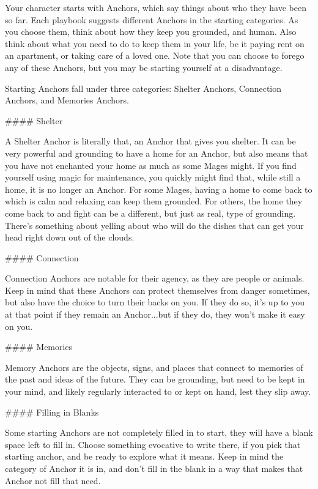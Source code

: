 \documentclass[
  oneside,
  statementpaper,
  9pt]{memoir}
\begin{document}
\begin{Player}

Your character starts with Anchors, which say things about who they have been so far. Each playbook suggests different Anchors in the starting categories. As you choose them, think about how they keep you grounded, and human. Also think about what you need to do to keep them in your life, be it paying rent on an apartment, or taking care of a loved one. Note that you can choose to forego any of these Anchors, but you may be starting yourself at a disadvantage.

Starting Anchors fall under three categories: Shelter Anchors, Connection Anchors, and Memories Anchors.

#### Shelter

A Shelter Anchor is literally that, an Anchor that gives you shelter. It can be very powerful and grounding to have a home for an Anchor, but also means that you have not enchanted your home as much as some Mages might. If you find yourself using magic for maintenance, you quickly might find that, while still a home, it is no longer an Anchor. For some Mages, having a home to come back to which is calm and relaxing can keep them grounded. For others, the home they come back to and fight can be a different, but just as real, type of grounding. There’s something about yelling about who will do the dishes that can get your head right down out of the clouds.

#### Connection

Connection Anchors are notable for their agency, as they are people or animals. Keep in mind that these Anchors can protect themselves from danger sometimes, but also have the choice to turn their backs on you. If they do so, it’s up to you at that point if they remain an Anchor...but if they do, they won’t make it easy on you.

#### Memories

Memory Anchors are the objects, signs, and places that connect to memories of the past and ideas of the future. They can be grounding, but need to be kept in your mind, and likely regularly interacted to or kept on hand, lest they slip away.

#### Filling in Blanks

Some starting Anchors are not completely filled in to start, they will have a blank space left to fill in. Choose something evocative to write there, if you pick that starting anchor, and be ready to explore what it means. Keep in mind the category of Anchor it is in, and don’t fill in the blank in a way that makes that Anchor not fill that need.

\end{Player}
\end{document}

